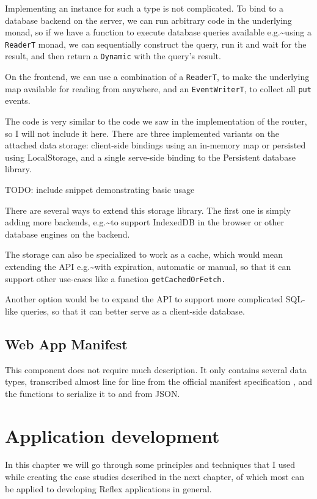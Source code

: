 \documentclass[english,odsaz]{fitthesis}
\begin{document}
Implementing an instance for such a type is not complicated. To
bind to a database backend on the server, we can run arbitrary code in the
underlying monad, so if we have a function to execute database
queries available e.g.\textasciitilde{}using a \texttt{ReaderT} monad, we can sequentially construct the
query, run it and wait for the result, and then return a \texttt{Dynamic} with the
query's result.

On the frontend, we can use a combination of a \texttt{ReaderT}, to
make the underlying map available for reading from anywhere, and an
\texttt{EventWriterT}, to collect all \texttt{put} events.

The code is very similar to the code we saw in the implementation of the router,
so I will not include it here. There are three implemented variants on the
attached data storage: client-side bindings using an in-memory map or persisted
using LocalStorage, and a single serve-side binding to the Persistent database library.

TODO: include snippet demonstrating basic usage

There are several ways to extend this storage library. The first one is simply
adding more backends, e.g.\textasciitilde{}to support IndexedDB in the browser or other database
engines on the backend.

The storage can also be specialized to work as a cache, which would mean
extending the API e.g.\textasciitilde{}with expiration, automatic or manual, so that it can
support other use-cases like a function \texttt{getCachedOrFetch.}

Another option would be to expand the API to support more complicated SQL-like
queries, so that it can better serve as a client-side database.

\section{Web App Manifest}
\label{sec:orgf93eead}
This component does not require much description. It only contains several data
types, transcribed almost line for line from the official manifest specification
\cite{webapp-manifest}, and the functions to serialize it to and from JSON.

\chapter{Application development}
\label{sec:orgc99c4ee}
In this chapter we will go through some principles and techniques that I used
while creating the case studies described in the next chapter, of which most can
be applied to developing Reflex applications in general.
\end{document}
